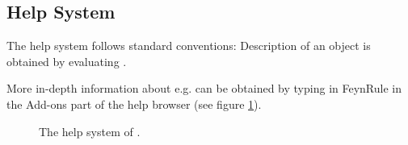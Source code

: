 \subsection{Help System}

The help system follows standard \mma conventions: Description of an object  is obtained by evaluating .

\beom
{}
\enom

More in-depth information about e.g.  can be obtained by typing in FeynRule in the Add-ons part of the help browser (see figure \ref{help}).

\begin{figure}[ht]
\ifpdf
\else
\setlength\abovecaptionskip{-80pt}
\fi
\begin{center}
\caption{The help system of \fc.}
\label{help}
\end{center}
\end{figure}


